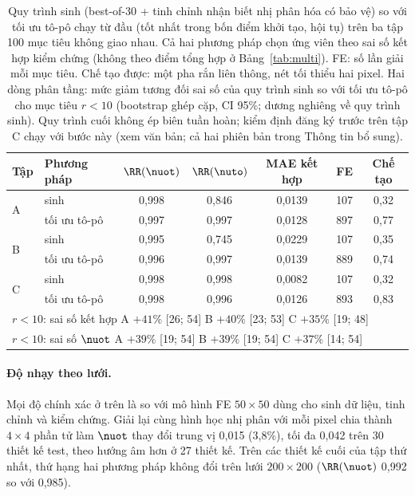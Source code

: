 \begin{table}[t]
\centering
\caption{Quy trình sinh (best-of-30 + tinh chỉnh nhận biết nhị phân hóa có
bảo vệ) so với tối ưu tô-pô chạy từ đầu (tốt nhất trong bốn điểm khởi tạo,
hội tụ) trên ba tập 100 mục tiêu không giao nhau. Cả hai phương pháp chọn
ứng viên theo sai số kết hợp kiểm chứng (không theo điểm tổng hợp ở
Bảng~\ref{tab:multi}). FE: số lần giải mỗi mục
tiêu. Chế tạo được: một pha rắn liên thông, nét tối thiểu hai pixel. Hai dòng
phân tầng: mức giảm tương đối sai số của quy trình sinh so với tối ưu tô-pô
cho mục tiêu $r<10$ (bootstrap ghép cặp, CI 95\%; dương nghiêng về quy trình
sinh). Quy trình cuối không ép biên tuần hoàn; kiểm định đăng ký trước trên
tập C chạy với bước này (xem văn bản; cả hai phiên bản trong Thông tin bổ
sung).}
\label{tab:simp}
\small
\setlength{\tabcolsep}{3.5pt}
\begin{tabular}{llccccc}
\toprule
Tập & Phương pháp & $\RR(\nuot)$ & $\RR(\nuto)$ & MAE kết hợp & FE & Chế tạo\\
\midrule
\multirow{2}{*}{A} & sinh & 0,998 & 0,846 & 0,0139 & 107 & 0,32\\
 & tối ưu tô-pô & 0,997 & 0,997 & 0,0128 & 897 & 0,77\\
\multirow{2}{*}{B} & sinh & 0,995 & 0,745 & 0,0229 & 107 & 0,35\\
 & tối ưu tô-pô & 0,996 & 0,997 & 0,0139 & 889 & 0,74\\
\multirow{2}{*}{C} & sinh & 0,998 & 0,998 & 0,0082 & 107 & 0,32\\
 & tối ưu tô-pô & 0,998 & 0,996 & 0,0126 & 893 & 0,83\\
\midrule
\multicolumn{7}{l}{$r<10$: sai số kết hợp \;A $+41\%$ [26; 54] \;B $+40\%$ [23; 53] \;C $+35\%$ [19; 48]}\\
\multicolumn{7}{l}{$r<10$: sai số $\nuot$ \;A $+39\%$ [19; 54] \;B $+39\%$ [19; 54] \;C $+37\%$ [14; 54]}\\
\bottomrule
\end{tabular}
\end{table}

\paragraph{Độ nhạy theo lưới.}
Mọi độ chính xác ở trên là so với mô hình FE $50\times50$ dùng cho sinh dữ
liệu, tinh chỉnh và kiểm chứng. Giải lại cùng hình học nhị phân với mỗi pixel
chia thành $4\times4$ phần tử làm $\nuot$ thay đổi trung vị 0,015 (3,8\%), tối
đa 0,042 trên 30 thiết kế test, theo hướng âm hơn ở 27 thiết kế. Trên các
thiết kế cuối của tập thứ nhất, thứ hạng hai phương pháp không đổi trên lưới
$200\times200$ ($\RR(\nuot)$ 0,992 so với 0,985).


